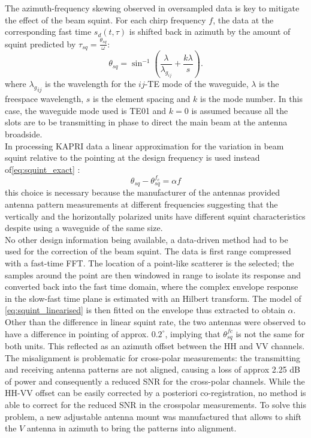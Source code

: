 The azimuth-frequency skewing observed in oversampled data is key to mitigate the effect of the beam squint. For each chirp frequency $f$, the data at the corresponding fast time $s_{d}\left(t,\tau\right)$ is shifted back in azimuth by the amount of squint predicted by $\tau_{sq}=\frac{\theta_{sq}}{\omega}$:
\begin{equation}\label{eq:squint_exact}
	\theta_{sq} = \sin^{-1}\left(\frac{\lambda}{\lambda_{g_{ij}}} + \frac{k \lambda}{s}\right).
\end{equation}
where ${\lambda_g}_{ij}$ is the wavelength for the $ij$-TE mode of the waveguide, $\lambda$ is the freespace wavelength, $s$ is the element spacing and $k$ is the mode number. In this case, the waveguide mode used is TE01 and $k=0$ is assumed because all the slots are to be transmitting in phase\cite{kraus88} to direct the main beam at the antenna broadside.\\
In processing KAPRI data a linear approximation for  the variation in beam squint relative to the pointing at the design frequency is used instead of\autoref{eq:squint_exact} :
\begin{equation}\label{eq:squint_linearised}
	\theta_{sq} - \theta_{sq}^{f_{c}}  =  \alpha f
\end{equation}
this choice is necessary because the manufacturer of the antennas provided antenna pattern measurements at different frequencies suggesting that the vertically and the horizontally polarized units have different squint characteristics despite using a waveguide of the same size.\\ No other design information being available, a data-driven method had to be used for the correction of the beam squint.  The data is first range compressed with a fast-time FFT. The location of a point-like scatterer is the selected; the samples around the point are then windowed in range to isolate its response and converted back into the fast time domain, where the complex envelope response in the slow-fast time plane is estimated with an Hilbert transform. The model of \autoref{eq:squint_linearised} is then fitted on the envelope thus extracted to obtain $\alpha$.
Other than the difference in linear squint rate, the two antennas were observed to have a difference in pointing of approx. $0.2^\circ$,
implying that $\theta_{sq}^{fc}$ is not the same for both units. This reflected as an azimuth offset between the HH and VV channels. The misalignment is problematic for cross-polar measurements: the transmitting and receiving antenna patterns are not aligned, causing a loss of approx 2.25 dB of power and consequently a reduced SNR for the cross-polar channels. While the HH-VV offset can be easily corrected by a posteriori co-registration, no method is able to correct for the reduced SNR in the crosspolar measurements. To solve this problem, a new adjustable antenna mount was manufactured that allows to shift the $V$ antenna in azimuth to bring the patterns into alignment.\\

